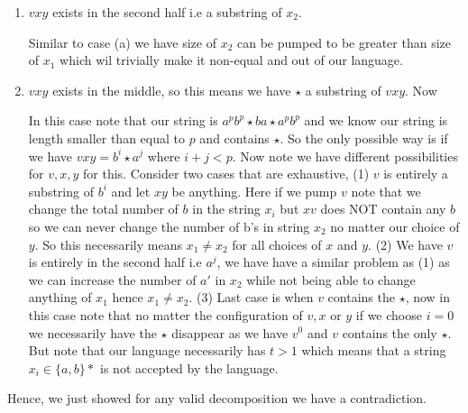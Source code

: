 \documentclass[11pt]{article}
\begin{document}
\begin{enumerate}
\begin{answer}
\begin{enumerate}
      \qquad Now in this case if $vxy \subset x_{1}$, then note that for any choice of $vy$ such that $|vy| > 0$, if we pump $v$ and $y$ then we trivially increase (or decrease if $i = 0$) the size of the string $x_{1}$. However this means that we can never have $x_{1} = x_{2}$ because $|x_{1}| \ne |x_{2}|$.
    \item $vxy$ exists in the second half i.e a substring of $x_{2}$. 

      \qquad Similar to case (a) we have size of $x_{2}$ can be pumped to be greater than size of $x_{1}$ which wil trivially make it non-equal and out of our language.

    \item $vxy$ exists in the middle, so this means we have $\star$ a substring of $vxy$. Now 

      \qquad In this case note that our string is $a^{p}b^{p}\star ba \star a^{p}b^{p}$ and we know our string is length smaller than equal to $p$ and contains $\star$. So the only possible way is if we have $vxy = b^{i}\star a^{j}$ where $i + j < p$. Now note we have different possibilities for $v, x, y$ for this. Consider two cases that are exhaustive, (1) $v$ is entirely a substring of $b^{i}$ and let $x y$ be anything. Here if we pump $v$ note that we change the total number of $b$ in the string $x_i$ but $xv$ does NOT contain any $b$ so we can never change the number of b's in string $x_{2}$ no matter our choice of $y$. So this necessarily means $x_{1} \ne x_{2}$ for all choices of $x$ and $y$. (2) We have $v$ is entirely in the second half i.e $a^{j}$, we have have a similar problem as (1) as we can increase the number of $a'$ in $x_{2}$ while not being able to change anything of $x_{1}$ hence $x_{1} \ne x_{2}$. (3) Last case is when $v$ contains the $\star$, now in this case note that no matter the configuration of $v, x$  or $y$ if we choose $i = 0$ we necessarily have the $ \star $ disappear as we have $v^{0}$ and $v$ contains the only $\star$. But note that our language necessarily has $t > 1$  which means that a string $x_i \in \{a, b\}*$ is not accepted by the language.
  \end{enumerate}

  Hence, we just showed for any valid decomposition we have a contradiction.
\end{answer}

\end{enumerate}
\end{document}

